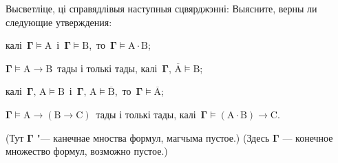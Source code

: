 \begin{problemList}
\smallskip

\problemItemWithCommonPartComplicated
{Высветліце, ці справядлівыя наступныя сцвярджэнні:}
{Выясните, верны ли следующие утверждения:}
{%
\begin{belarusianEnumerate}
	\item калі\, $\boldsymbol{\Gamma} \vDash \boldsymbol{\mathrm{A}}$\, і\, $\boldsymbol{\Gamma}
	\vDash \boldsymbol{\mathrm{B}}$,\, то\, $\boldsymbol{\Gamma} \vDash \boldsymbol{\mathrm{A}} \cdot
	\boldsymbol{\mathrm{B}}$;
	\item $\boldsymbol{\Gamma} \vDash \boldsymbol{\mathrm{A}} \to \boldsymbol{\mathrm{B}}$\, тады
	і толькі тады, калі\, $\boldsymbol{\Gamma},\, \overline{\boldsymbol{\mathrm{A}}} \vDash \boldsymbol{\mathrm{B}}$;
	\item калі\, $\boldsymbol{\Gamma},\, \boldsymbol{\mathrm{A}} \vDash \boldsymbol{\mathrm{B}}$\, і\,
	$\boldsymbol{\Gamma},\, \boldsymbol{\mathrm{A}} \vDash \overline{\boldsymbol{\mathrm{B}}}$,\, то\,
	$\boldsymbol{\Gamma} \vDash \overline{\boldsymbol{\mathrm{A}}}$;
	\item $\boldsymbol{\Gamma} \vDash \boldsymbol{\mathrm{A}} \to (\boldsymbol{\mathrm{B}}
	\to \boldsymbol{\mathrm{C}})$\, тады і толькі тады, калі\, $\boldsymbol{\Gamma} \vDash (\boldsymbol{\mathrm{A}} \cdot \boldsymbol{\mathrm{B}}) \to \boldsymbol{\mathrm{C}}$.
\end{belarusianEnumerate}
}
{(Тут $\boldsymbol{\Gamma}$ "--- канечнае мноства формул, магчыма пустое.)}
{(Здесь $\boldsymbol{\Gamma}$ --- конечное множество формул, возможно пустое.)}

\end{problemList}


